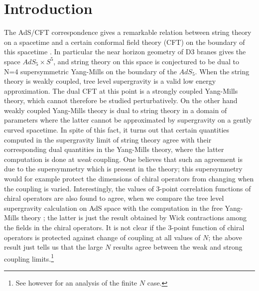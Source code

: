\documentclass[12pt]{article}
\begin{document}
\section{Introduction}
\renewcommand{\theequation}{1.\arabic{equation}}
\setcounter{equation}{0}

The AdS/CFT correspondence gives a remarkable
relation between string theory on   a spacetime  and a certain
conformal field theory (CFT) on the
boundary of this spacetime \cite{mal}.  In particular the near horizon geometry
of D3 branes gives the space
$AdS_5\times S^5$, and string theory on this space is conjectured to
be dual to N=4 supersymmetric Yang-Mills on the
boundary of the $AdS_5$. When the string theory is weakly coupled,
tree level supergravity is a valid low energy
approximation. The dual  CFT at this point is a strongly coupled
Yang-Mills theory, which cannot therefore be studied
perturbatively. On the other hand weakly coupled Yang-Mills theory is
dual to string theory in a domain of parameters
where the latter cannot be approximated by supergravity on a gently
curved spacetime. In spite of this fact, it turns out
that certain quantities computed in the supergravity limit of string
theory agree with their corresponding dual quantities
in the Yang-Mills theory, where the latter computation is done at {\it
weak} coupling. One believes that such an agreement is
due to the supersymmetry which is present in the theory; this
supersymmetry would for example protect the dimensions
of chiral operators from changing when the coupling is varied.
Interestingly, the values of 3-point correlation functions of
chiral operators are also found to agree, when we compare the tree
level supergravity calculation on AdS space with the
computation in the free Yang-Mills theory \cite{threepoint}; the
latter is just the
result obtained by Wick contractions among the fields in
the chiral operators. It is not clear if the 3-point function of
chiral operators is protected against change of coupling at all
values of $N$; the above result just tells us that the large $N$
results agree between the  weak and strong coupling
limits.\footnote{See however \cite{howe} for an analysis of
the finite $N$ case.}
\end{document}
